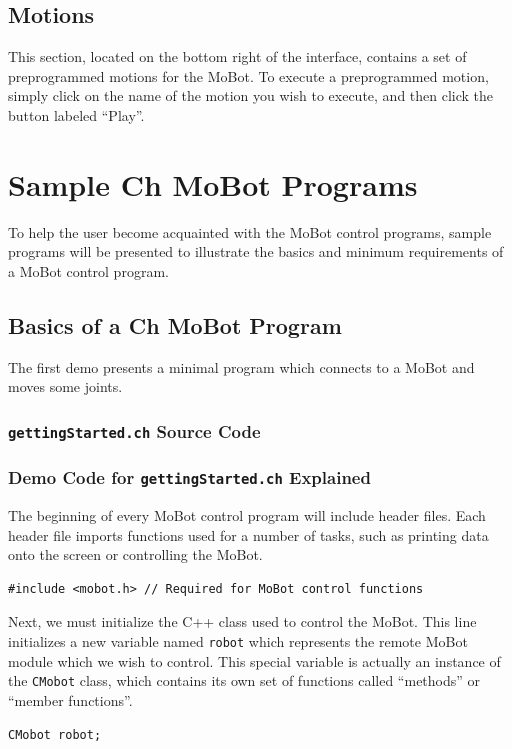 \documentclass{article}
\begin{document}
\subsection{Motions}
This section, located on the bottom right of the interface, contains a set of
preprogrammed motions for the MoBot. To execute a preprogrammed motion, simply
click on the name of the motion you wish to execute, and then click the button
labeled ``Play''.

\section{Sample Ch MoBot Programs}
To help the user become acquainted with the MoBot control programs, sample
programs will be presented to illustrate the basics and minimum requirements of
a MoBot control program. 

\subsection{Basics of a Ch MoBot Program}
The first demo presents a minimal program which connects to a MoBot and
moves some joints.

\subsubsection{\texttt{gettingStarted.ch} Source Code}


\subsubsection{\label{sec:democode}Demo Code for \texttt{gettingStarted.ch} Explained}
The beginning of every MoBot control program will include header files. Each
header file imports functions used for a number of tasks, such as printing
data onto the screen or controlling the MoBot. 

\begin{verbatim}
#include <mobot.h> // Required for MoBot control functions
\end{verbatim}

Next, we must initialize the C++ class used to control the MoBot. This line
initializes a new variable named \texttt{robot} which represents the remote
MoBot module which we wish to control. This special variable is actually an
instance of the \texttt{CMobot} class, which contains its own set of
functions called ``methods'' or ``member functions''.
\begin{verbatim}
CMobot robot;
\end{verbatim}
\end{document}
